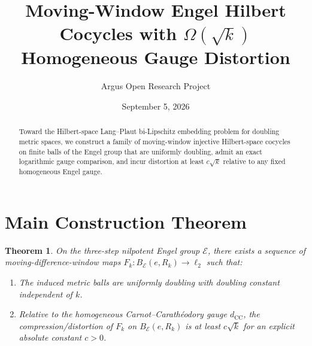 \documentclass[10pt,reqno]{amsart}
\title[Moving-Window Engel Hilbert Cocycles with $\Omega(\sqrt{k})$ Gauge Distortion]
{Moving-Window Engel Hilbert Cocycles with $\Omega(\sqrt{k})$ Homogeneous Gauge Distortion}
\author{Argus Open Research Project}
\date{September 5, 2026}
\newtheorem{theorem}{Theorem}[section]
\theoremstyle{definition}
\begin{document}
\begin{abstract}
Toward the Hilbert-space Lang--Plaut bi-Lipschitz embedding problem for doubling metric spaces, we construct a family of moving-window injective Hilbert-space cocycles on finite balls of the Engel group that are uniformly doubling, admit an exact logarithmic gauge comparison, and incur distortion at least $c\sqrt{k}$ relative to any fixed homogeneous Engel gauge.
\end{abstract}
\maketitle
\section{Main Construction Theorem}
\begin{theorem}
On the three-step nilpotent Engel group $\mathcal{E}$, there exists a sequence of moving-difference-window maps $F_k : B_{\mathcal{E}}(e, R_k) \to \ell_2$ such that:
\begin{enumerate}[label=\textup{(\arabic*)}]
  \item The induced metric balls are uniformly doubling with doubling constant independent of $k$.
  \item Relative to the homogeneous Carnot--Carath\'eodory gauge $d_{\mathrm{CC}}$, the compression/distortion of $F_k$ on $B_{\mathcal{E}}(e, R_k)$ is at least $c\sqrt{k}$ for an explicit absolute constant $c>0$.
\end{enumerate}
\end{theorem}
\end{document}
